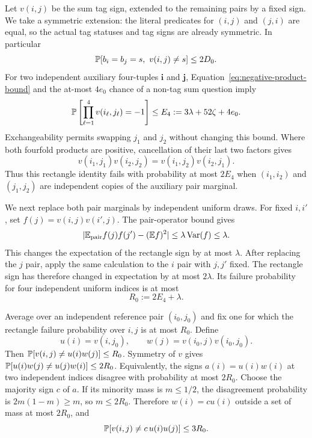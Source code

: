 Let $v(i,j)$ be the sum tag sign, extended to the remaining pairs
by a fixed sign. We take a symmetric extension: the literal
predicates for $(i,j)$ and $(j,i)$ are equal, so the actual tag
statuses and tag signs are already symmetric. In particular
\begin{equation}\label{eq:sum-sign-on-classes}
 \mathbb P[b_i=b_j=s,\ v(i,j)\ne s]\leq2D_0.
\end{equation}
For two independent auxiliary four-tuples $\boldsymbol i$ and
$\boldsymbol j$, Equation~\ref{eq:negative-product-bound} and the
at-most $4e_0$ chance of a non-tag sum question imply
\begin{equation}\label{eq:sum-four-product}
 \mathbb P\left[\prod_{\ell=1}^4v(i_\ell,j_\ell)=-1\right]
 \leq E_4:=3\lambda+52\zeta+4e_0.
\end{equation}
Exchangeability permits swapping $j_1$ and $j_2$ without changing
this bound. Where both fourfold products are positive, cancellation
of their last two factors gives
\[
 v(i_1,j_1)v(i_2,j_2)
 =v(i_1,j_2)v(i_2,j_1).
\]
Thus this rectangle identity fails with probability at most $2E_4$
when $(i_1,i_2)$ and $(j_1,j_2)$ are independent copies of the
auxiliary pair marginal.

We next replace both pair marginals by independent uniform draws.
For fixed $i,i'$, set $f(j)=v(i,j)v(i',j)$. The pair-operator bound
gives
\[
 \lvert\mathbb E_{\rm pair}f(j)f(j')-(\mathbb E f)^2\rvert
 \leq\lambda\operatorname{Var}(f)\leq\lambda.
\]
This changes the expectation of the rectangle sign by at most
$\lambda$. After replacing the $j$ pair, apply the same calculation
to the $i$ pair with $j,j'$ fixed. The rectangle sign has therefore
changed in expectation by at most $2\lambda$. Its failure
probability for four independent uniform indices is at most
\begin{equation}\label{eq:independent-rectangle-error}
 R_0:=2E_4+\lambda.
\end{equation}

Average over an independent reference pair $(i_0,j_0)$ and fix one
for which the rectangle failure probability over $i,j$ is at most
$R_0$. Define
\[
 u(i)=v(i,j_0),\qquad
 w(j)=v(i_0,j)v(i_0,j_0).
\]
Then
$\mathbb P[v(i,j)\ne u(i)w(j)]\leq R_0$.
Symmetry of $v$ gives
$\mathbb P[u(i)w(j)\ne u(j)w(i)]\leq2R_0$.
Equivalently, the signs $a(i)=u(i)w(i)$ at two independent indices
disagree with probability at most $2R_0$.
Choose the majority sign $c$ of $a$. If its minority mass is
$m\leq1/2$, the disagreement probability is $2m(1-m)\geq m$,
so $m\leq2R_0$. Therefore $w(i)=cu(i)$ outside a set of mass at
most $2R_0$, and
\begin{equation}\label{eq:symmetric-sign-factorization}
 \mathbb P[v(i,j)\ne c\,u(i)u(j)]\leq3R_0.
\end{equation}


